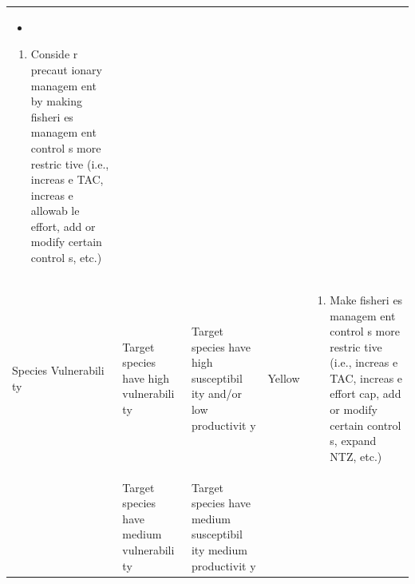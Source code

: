 \documentclass[]{book}
\providecommand{\tightlist}{%
  \setlength{\itemsep}{0pt}\setlength{\parskip}{0pt}}
\begin{document}
\begin{longtable}[]{@{}lllll@{}}
\begin{minipage}[t]{0.19\columnwidth}
\begin{itemize}
\item
\end{itemize}

\begin{enumerate}
\def\labelenumi{\arabic{enumi}.}
\setcounter{enumi}{1}
\tightlist
\item
  Conside r precaut ionary managem ent by making fisheri es managem ent
  control s more restric tive (i.e., increas e TAC, increas e allowab le
  effort, add or modify certain control s, etc.)
\end{enumerate}\strut
\end{minipage}\tabularnewline
\begin{minipage}[t]{0.19\columnwidth}\raggedright\strut
Species Vulnerabili ty\strut
\end{minipage} & \begin{minipage}[t]{0.19\columnwidth}\raggedright\strut
Target species have high vulnerabili ty\strut
\end{minipage} & \begin{minipage}[t]{0.19\columnwidth}\raggedright\strut
Target species have high susceptibil ity and/or low productivit y\strut
\end{minipage} & \begin{minipage}[t]{0.19\columnwidth}\raggedright\strut
Yellow\strut
\end{minipage} & \begin{minipage}[t]{0.19\columnwidth}\raggedright\strut
\begin{enumerate}
\def\labelenumi{\arabic{enumi}.}
\tightlist
\item
  Make fisheri es managem ent control s more restric tive (i.e., increas
  e TAC, increas e effort cap, add or modify certain control s, expand
  NTZ, etc.)
\end{enumerate}\strut
\end{minipage}\tabularnewline
\begin{minipage}[t]{0.19\columnwidth}\raggedright\strut
\strut
\end{minipage} & \begin{minipage}[t]{0.19\columnwidth}\raggedright\strut
Target species have medium vulnerabili ty\strut
\end{minipage} & \begin{minipage}[t]{0.19\columnwidth}\raggedright\strut
Target species have medium susceptibil ity medium productivit y\strut
\end{minipage} & \begin{minipage}[t]{0.19\columnwidth}\raggedright\strut

\end{minipage}
\end{longtable}
\end{document}
